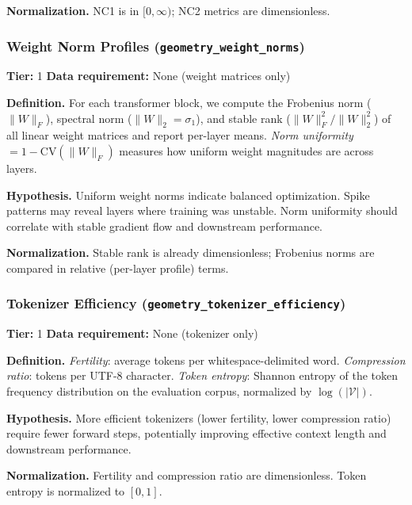 \documentclass{article}
\begin{document}
\textbf{Normalization.} NC1 is in $[0, \infty)$; NC2 metrics are dimensionless.

\subsubsection{Weight Norm Profiles (\texttt{geometry\_weight\_norms})}
\label{app:weight-norms}

\textbf{Tier:} 1 \quad \textbf{Data requirement:} None (weight matrices only)

\textbf{Definition.}
For each transformer block, we compute the Frobenius norm ($\|W\|_F$), spectral norm ($\|W\|_2 = \sigma_1$), and stable rank ($\|W\|_F^2 / \|W\|_2^2$) of all linear weight matrices and report per-layer means. \emph{Norm uniformity} $= 1 - \text{CV}(\|W\|_F)$ measures how uniform weight magnitudes are across layers.

\textbf{Hypothesis.} Uniform weight norms indicate balanced optimization. Spike patterns may reveal layers where training was unstable. Norm uniformity should correlate with stable gradient flow and downstream performance.

\textbf{Normalization.} Stable rank is already dimensionless; Frobenius norms are compared in relative (per-layer profile) terms.

\subsubsection{Tokenizer Efficiency (\texttt{geometry\_tokenizer\_efficiency})}
\label{app:tokenizer}

\textbf{Tier:} 1 \quad \textbf{Data requirement:} None (tokenizer only)

\textbf{Definition.}
\emph{Fertility}: average tokens per whitespace-delimited word. \emph{Compression ratio}: tokens per UTF-8 character. \emph{Token entropy}: Shannon entropy of the token frequency distribution on the evaluation corpus, normalized by $\log(|\mathcal{V}|)$.

\textbf{Hypothesis.} More efficient tokenizers (lower fertility, lower compression ratio) require fewer forward steps, potentially improving effective context length and downstream performance.

\textbf{Normalization.} Fertility and compression ratio are dimensionless. Token entropy is normalized to $[0,1]$.

\end{document}
